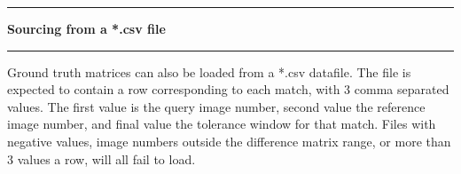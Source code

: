 \noindent\rule{\textwidth}{1pt}
\indent \textbf{Sourcing from a *.csv file}
\noindent\rule{\textwidth}{1pt}
\smallskip
\parbox{\textwidth}{Ground truth matrices can also be loaded from a *.csv datafile. The file is expected to contain a row corresponding to each match, with 3 comma separated values. The first value is the query image number, second value the reference image number, and final value the tolerance window for that match. Files with negative values, image numbers outside the difference matrix range, or more than 3 values a row, will all fail to load.}

